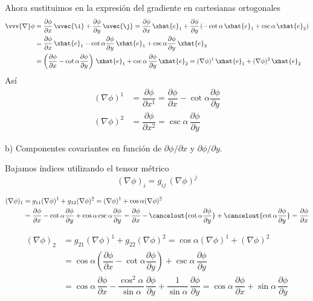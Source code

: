 Ahora sustituimos en la expresión del gradiente en cartesianas ortogonales
\begin{align*}
  \vvv{\nabla}\phi
  &=
    \dfrac{\partial\phi}{\partial x}\,\uvec{\i}
    + \dfrac{\partial\phi}{\partial y}\,\uvec{\j}
    = \dfrac{\partial\phi}{\partial x}\,\xhat{e}_1
    + \dfrac{\partial\phi}{\partial y}
    \left(-\cot\alpha\,\xhat{e}_1+\csc\alpha\,\xhat{e}_2\right)\\
  &=
    \dfrac{\partial\phi}{\partial x}\,\xhat{e}_1
    - \cot\alpha\dfrac{\partial\phi}{\partial y}\,\xhat{e}_1
    + \csc\alpha\dfrac{\partial\phi}{\partial y}\,\xhat{e}_2\\
  &=
    \left(%
    \dfrac{\partial\phi}{\partial x}-\cot\alpha\dfrac{\partial\phi}{\partial y}
    \right)\,\xhat{e}_1
    + \csc\alpha\,\dfrac{\partial\phi}{\partial y}\,\xhat{e}_2
    = (\nabla\phi)^1\,\xhat{e}_1 + (\nabla\phi)^2\,\xhat{e}_2
\end{align*}
Así
\begin{align*}
  (\nabla\phi)^1
  &=
    \dfrac{\partial\phi}{\partial x^1}
    = \dfrac{\partial\phi}{\partial x}-\cot\alpha\dfrac{\partial\phi}{\partial y}\\
  (\nabla\phi)^2
  &=
    \dfrac{\partial\phi}{\partial x^2}
    = \csc\alpha\,\dfrac{\partial\phi}{\partial y}
\end{align*}
  
\noindent
b) Componentes covariantes en función de $\partial\phi/\partial x$ y
$\partial\phi/\partial y$.

Bajamos índices utilizando el tensor métrico
\[
  (\nabla\phi)_i = g_{ij}\,(\nabla\phi)^j
\]

\begin{align*}
  (\nabla\phi)_1
  &=
    g_{11}(\nabla\phi)^1 + g_{12}(\nabla\phi)^2
    = (\nabla\phi)^1 + \cos\alpha (\nabla\phi)^2\\
  &=
    \dfrac{\partial\phi}{\partial x}-\cot\alpha\dfrac{\partial\phi}{\partial y}
    + \cos\alpha\csc\alpha\dfrac{\partial\phi}{\partial y}
    = \dfrac{\partial\phi}{\partial x}
    - \cancelout{\cot\alpha\dfrac{\partial\phi}{\partial y}}
    + \cancelout{\cot\alpha\dfrac{\partial\phi}{\partial y}}
    =
    \dfrac{\partial\phi}{\partial x}
\end{align*}

\begin{align*}
  (\nabla\phi)_2
  &=
    g_{21}(\nabla\phi)^1 + g_{22}(\nabla\phi)^2
    = \cos\alpha (\nabla\phi)^1 + (\nabla\phi)^2\\
  &=
    \cos\alpha
    \left(%
    \dfrac{\partial\phi}{\partial x}-\cot\alpha\dfrac{\partial\phi}{\partial y}
    \right)
    + \csc\alpha\,\dfrac{\partial\phi}{\partial y}\\
  &= \cos\alpha\,\dfrac{\partial\phi}{\partial x}
    - \dfrac{\cos^2\alpha}{\sin\alpha}\,\dfrac{\partial\phi}{\partial y}
    + \dfrac{1}{\sin\alpha}\,\dfrac{\partial\phi}{\partial y}
    = \cos\alpha\,\dfrac{\partial\phi}{\partial x}
    + \sin\alpha\,\dfrac{\partial\phi}{\partial y}
\end{align*}

